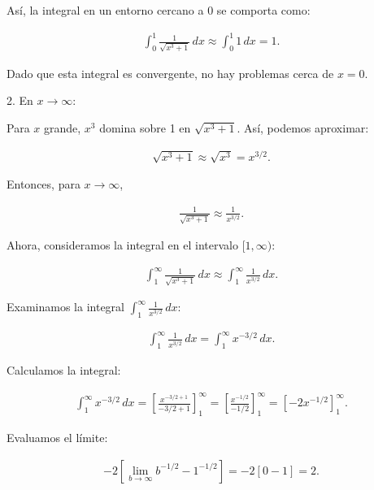 \documentclass{article}
\begin{document}
    Así, la integral en un entorno cercano a 0 se comporta como:

    \begin{align*}
    \int_{0}^{1} \frac{1}{\sqrt{x^3 + 1}} \, dx \approx \int_{0}^{1} 1 \, dx = 1.
    \end{align*}

    Dado que esta integral es convergente, no hay problemas cerca de \( x = 0 \).

    2. En \( x \to \infty \):

    Para \( x \) grande, \( x^3 \) domina sobre 1 en \( \sqrt{x^3 + 1} \). Así, podemos aproximar:

    \begin{align*}
    \sqrt{x^3 + 1} \approx \sqrt{x^3} = x^{3/2}.
    \end{align*}

    Entonces, para \( x \to \infty \),

    \begin{align*}
    \frac{1}{\sqrt{x^3 + 1}} \approx \frac{1}{x^{3/2}}.
    \end{align*}

    Ahora, consideramos la integral en el intervalo \([1, \infty)\):

    \begin{align*}
    \int_{1}^{\infty} \frac{1}{\sqrt{x^3 + 1}} \, dx \approx \int_{1}^{\infty} \frac{1}{x^{3/2}} \, dx.
    \end{align*}

    Examinamos la integral \( \int_{1}^{\infty} \frac{1}{x^{3/2}} \, dx \):

    \begin{align*}
    \int_{1}^{\infty} \frac{1}{x^{3/2}} \, dx = \int_{1}^{\infty} x^{-3/2} \, dx.
    \end{align*}

    Calculamos la integral:

    \begin{align*}
    \int_{1}^{\infty} x^{-3/2} \, dx = \left[ \frac{x^{-3/2+1}}{-3/2+1} \right]_{1}^{\infty} = \left[ \frac{x^{-1/2}}{-1/2} \right]_{1}^{\infty} = \left[ -2 x^{-1/2} \right]_{1}^{\infty}.
    \end{align*}

    Evaluamos el límite:

    \begin{align*}
    -2 \left[ \lim_{b \to \infty} b^{-1/2} - 1^{-1/2} \right] = -2 \left[ 0 - 1 \right] = 2.
    \end{align*}
\end{document}
